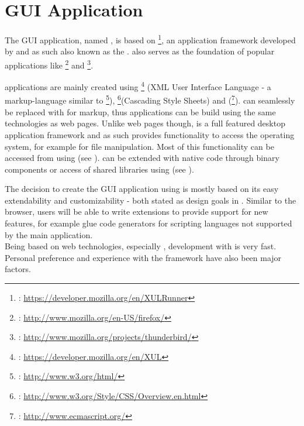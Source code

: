 \chapter{GUI Application}
\label{chap:GUIApplication}

The GUI application, named , is based on \footnote{: \url{https://developer.mozilla.org/en/XULRunner}}, an application \linebreak framework developed by  and as such also known as the . \linebreak{} also serves as the foundation of popular applications like \linebreak{}\footnote{: \url{http://www.mozilla.org/en-US/firefox/}} and \footnote{: \url{http://www.mozilla.org/projects/thunderbird/}}. 

 applications are mainly created using \footnote{: \url{https://developer.mozilla.org/en/XUL}} (XML User Interface Language - a markup-language similar to \footnote{: \url{http://www.w3.org/html/}}), \footnote{: \url{http://www.w3.org/Style/CSS/Overview.en.html}}(Cascading Style Sheets) and  (\footnote{: \url{http://www.ecmascript.org/}}).  can seamlessly be replaced with  for markup, thus  applications can be build using the same technologies as web pages. Unlike web pages though,  is a full featured desktop application framework and as such provides functionality to access the operating system, for example for file manipulation. Most of this functionality can be accessed from  using  (see ).  can be extended with native code through  binary components or access of shared libraries using  (see ).

The decision to create the GUI application using  is mostly based on its easy extendability and customizability - both stated as design goals in . Similar to the  browser, users will be able to write extensions to provide support for new features, for example glue code generators for scripting languages not supported by the main application.\\
Being based on web technologies, especially , development with   is very fast.
\\Personal preference and experience with the framework have also been major factors.

